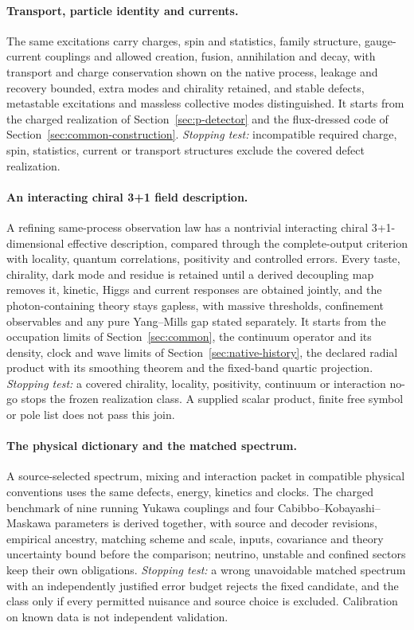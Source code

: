\documentclass[11pt]{article}
\theoremstyle{definition}
\theoremstyle{remark}
\theoremstyle{plain}
\begin{document}
\paragraph{Transport, particle identity and currents.} The same excitations
carry charges, spin and statistics, family structure, gauge-current
couplings and allowed creation, fusion, annihilation and decay, with
transport and charge conservation shown on the native process, leakage and
recovery bounded, extra modes and chirality retained, and stable defects,
metastable excitations and massless collective modes distinguished. It
starts from the charged realization of Section~\ref{sec:p-detector} and the
flux-dressed code of Section~\ref{sec:common-construction}. \emph{Stopping
test:} incompatible required charge, spin, statistics, current or transport
structures exclude the covered defect realization.

\paragraph{An interacting chiral 3+1 field description.} A refining
same-process observation law has a nontrivial interacting chiral
3+1-dimensional effective description, compared through the complete-output
criterion with locality, quantum correlations, positivity and controlled
errors. Every taste, chirality, dark mode and residue is retained until a
derived decoupling map removes it, kinetic, Higgs and current responses are
obtained jointly, and the photon-containing theory stays gapless, with
massive thresholds, confinement observables and any pure Yang--Mills gap
stated separately. It starts from the occupation limits of
Section~\ref{sec:common}, the continuum operator and its density, clock and
wave limits of Section~\ref{sec:native-history}, the declared radial product
with its smoothing theorem and the fixed-band quartic projection.
\emph{Stopping test:} a covered chirality, locality, positivity, continuum or
interaction no-go stops the frozen realization class. A supplied scalar
product, finite free symbol or pole list does not pass this join.

\paragraph{The physical dictionary and the matched spectrum.} A
source-selected spectrum, mixing and interaction packet in compatible
physical conventions uses the same defects, energy, kinetics and clocks. The
charged benchmark of nine running Yukawa couplings and four
Cabibbo--Kobayashi--Maskawa parameters is derived together, with source and
decoder revisions, empirical ancestry, matching scheme and scale, inputs,
covariance and theory uncertainty bound before the comparison; neutrino,
unstable and confined sectors keep their own obligations. \emph{Stopping
test:} a wrong unavoidable matched spectrum with an independently justified
error budget rejects the fixed candidate, and the class only if every
permitted nuisance and source choice is excluded. Calibration on known data
is not independent validation.
\end{document}
